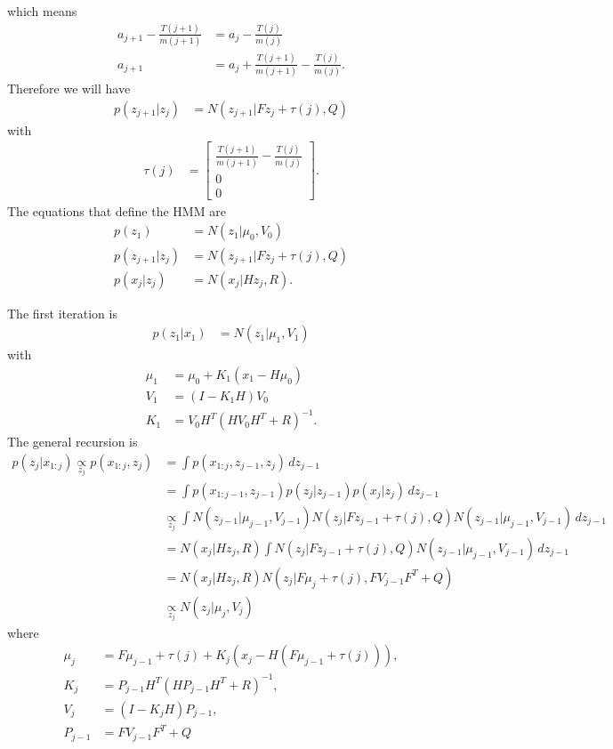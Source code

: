 \documentclass[11pt]{amsart}
\begin{document}
which means
\begin{align*}
a_{j+1} - \frac{T(j+1)}{m(j+1)} &= a_{j} - \frac{T(j)}{m(j)} \\
a_{j+1} &= a_{j} + \frac{T(j+1)}{m(j+1)} - \frac{T(j)}{m(j)}.
\end{align*}  
Therefore we will have
\begin{align*}
p(z_{j+1}|z_{j}) &= N\left(z_{j+1}| Fz_{j} + \tau(j), Q\right)
\end{align*}
with 
\begin{align*}
\tau(j) &= \begin{bmatrix}
\frac{T(j+1)}{m(j+1)} - \frac{T(j)}{m(j)} \\
0 \\
0
\end{bmatrix}.
\end{align*}
The equations that define the HMM are
\begin{align*}
p(z_{1}) &= N(z_{1} | \mu_{0}, V_{0}) \\
p(z_{j+1}|z_{j}) &= N\left(z_{j+1}| Fz_{j} + \tau(j), Q\right) \\
p(x_{j} | z_{j}) &= N(x_{j} | Hz_{j}, R).
\end{align*}

The first iteration is
\begin{align*}
p(z_{1}|x_{1}) &= N(z_{1}|\mu_{1}, V_{1})
\end{align*}
with
\begin{align*}
\mu_{1} &= \mu_{0} + K_{1}(x_{1} - H\mu_{0}) \\
V_{1} &= (I - K_{1}H)V_{0} \\
K_{1} &= V_{0}H^T(HV_{0}H^{T} + R)^{-1}.
\end{align*}
The general recursion is
\begin{align*}
p(z_{j}| x_{1:j}) \underset{z_{j}}{\propto} p(x_{1:j},z_{j}) &= \int p(x_{1:j},z_{j-1},z_{j}) \, dz_{j-1} \\
&= \int p(x_{1:j-1},z_{j-1})p(z_{j}|z_{j-1})p(x_{j}|z_{j})\,dz_{j-1} \\
&\underset{z_{j}}{\propto} \int N(z_{j-1}|\mu_{j-1}, V_{j-1})N(z_{j}|Fz_{j-1} + \tau(j), Q)N(z_{j-1}|\mu_{j-1}, V_{j-1})\,dz_{j-1} \\
&= N(x_{j}|Hz_{j}, R) \int N(z_{j}| Fz_{j-1} + \tau(j), Q)N(z_{j-1}|\mu_{j-1}, V_{j-1})\,dz_{j-1} \\
&= N(x_{j}|Hz_{j},R)N(z_{j}|F\mu_{j}+\tau(j), FV_{j-1}F^{T}+Q) \\
&\underset{z_{j}}{\propto} N(z_{j}| \mu_{j}, V_{j})
\end{align*}
where
\begin{align*}
\mu_{j} &= F\mu_{j-1} + \tau(j) + K_{j}(x_{j} - H(F\mu_{j-1}+\tau(j))), \\
K_{j} &= P_{j-1}H^{T}(HP_{j-1}H^{T} + R)^{-1}, \\
V_{j} &= (I - K_{j}H)P_{j-1}, \\
P_{j-1} &= FV_{j-1}F^{T} + Q
\end{align*}
\end{document}
